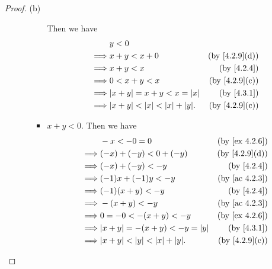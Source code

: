 \begin{proof}{(b)}
\begin{itemize}
\begin{itemize}
\begin{itemize}
                          Then we have
                          \begin{align*}
                                     & y < 0                                                                    \\
                            \implies & x + y < x + 0                              & \text{(by \cref{4.2.9}(d))} \\
                            \implies & x + y < x                                  & \text{(by \cref{4.2.4})}    \\
                            \implies & 0 < x + y < x                              & \text{(by \cref{4.2.9}(c))} \\
                            \implies & \abs{x + y} = x + y < x = \abs{x}          & \text{(by \cref{4.3.1})}    \\
                            \implies & \abs{x + y} < \abs{x} < \abs{x} + \abs{y}. & \text{(by \cref{4.2.9}(c))}
                          \end{align*}
                    \item \(x + y < 0\).
                          Then we have
                          \begin{align*}
                                     & -x < -0 = 0                                & \text{(by \cref{ex 4.2.6})} \\
                            \implies & (-x) + (-y) < 0 + (-y)                     & \text{(by \cref{4.2.9}(d))} \\
                            \implies & (-x) + (-y) < -y                           & \text{(by \cref{4.2.4})}    \\
                            \implies & (-1)x + (-1)y < -y                         & \text{(by \cref{ac 4.2.3})} \\
                            \implies & (-1)(x + y) < -y                           & \text{(by \cref{4.2.4})}    \\
                            \implies & -(x + y) < -y                              & \text{(by \cref{ac 4.2.3})} \\
                            \implies & 0 = -0 < -(x + y) < -y                     & \text{(by \cref{ex 4.2.6})} \\
                            \implies & \abs{x + y} = -(x + y) < -y = \abs{y}      & \text{(by \cref{4.3.1})}    \\
                            \implies & \abs{x + y} < \abs{y} < \abs{x} + \abs{y}. & \text{(by \cref{4.2.9}(c))}

\end{align*}
\end{itemize}
\end{itemize}
\end{itemize}
\end{proof}
